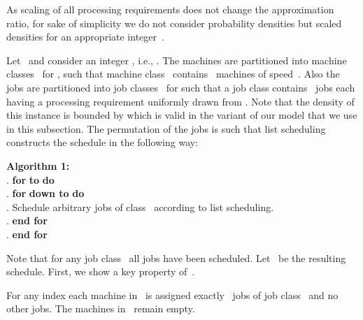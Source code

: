 \documentclass[a4paper,11pt,fleqn]{article}
\begin{document}
As scaling of all processing requirements does not change the approximation ratio, for sake of simplicity we do not consider probability densities  but scaled densities  for an appropriate integer~.

Let~ and consider an integer ,
i.e., . The machines are partitioned into machine
classes~ for , such that machine class~
contains~ machines of speed~. Also the jobs are partitioned into
job classes~ for  such that a job class
 contains~ jobs each having a processing
requirement uniformly drawn from . Note that the
density of this instance is bounded by  which is valid in
the variant of our model that we use in this subsection. The permutation
of the jobs is such that list scheduling constructs the schedule \sched in
the following way:

\begin{center}
{\parbox{0.95\linewidth}{\textbf{Algorithm 1:}\\
   . \quad \textbf{for}  \textbf{to}  \textbf{do}\\
   . \quad\quad \textbf{for}  \textbf{down to}  \textbf{do}\\
   . \quad\quad\quad Schedule  arbitrary jobs of
class~ according to list scheduling.\\
   . \quad\quad \textbf{end for}\\
   . \quad \textbf{end for}
 }}\end{center}
Note that for any job class~ all  jobs have been scheduled. Let~ be the resulting schedule. First, we show a key property of~.

\begin{lemma}
\label{lemma.list.schedule}
For any index  each machine in~ is assigned
exactly~ jobs of job class~ and no other jobs. The machines in~ remain empty.
\end{lemma}
\end{document}
